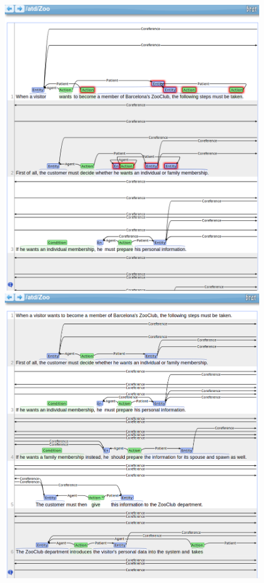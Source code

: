 \begin{figure}[htb]
  \centering
  \begin{minipage}{0.49\textwidth}
  \includegraphics[width=\textwidth]{figures/ann_example_auto}
  \end{minipage}
  \begin{minipage}{0.49\textwidth}
  \includegraphics[width=\textwidth]{figures/ann_example_final}

\end{minipage}
\end{figure}

